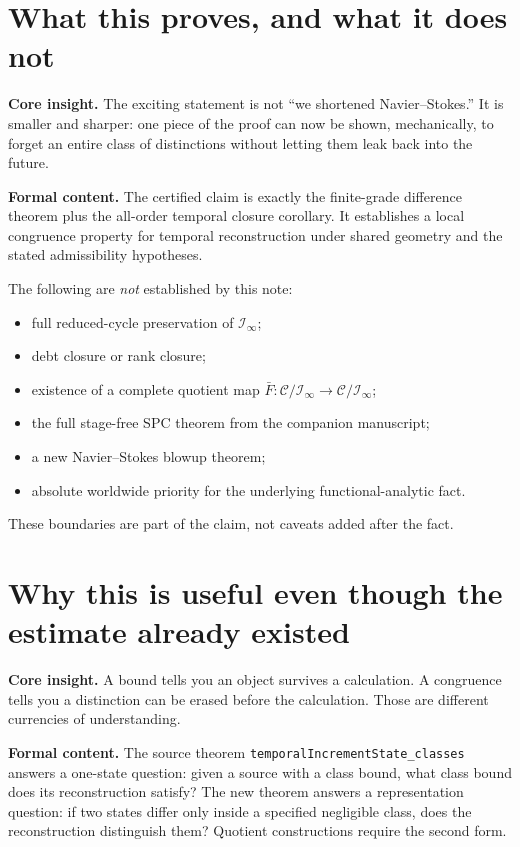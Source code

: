 \documentclass[11pt]{article}
\theoremstyle{highend}
\theoremstyle{definition}
\newcommand{\Iinf}{\mathcal I_{\infty}}
\begin{document}
\section{What this proves, and what it does not}
\begin{eurekabox}
\textbf{Core insight.} The exciting statement is not ``we shortened Navier--Stokes.'' It is smaller and sharper: one piece of the proof can now be shown, mechanically, to forget an entire class of distinctions without letting them leak back into the future.
\end{eurekabox}
\noindent\textbf{Formal content.}
The certified claim is exactly the finite-grade difference theorem plus the all-order temporal closure corollary. It establishes a local congruence property for temporal reconstruction under shared geometry and the stated admissibility hypotheses.

The following are \emph{not} established by this note:
\begin{itemize}
\item full reduced-cycle preservation of \(\Iinf\);
\item debt closure or rank closure;
\item existence of a complete quotient map \(\bar F:\mathcal C/\Iinf\to\mathcal C/\Iinf\);
\item the full stage-free SPC theorem from the companion manuscript;
\item a new Navier--Stokes blowup theorem;
\item absolute worldwide priority for the underlying functional-analytic fact.
\end{itemize}
These boundaries are part of the claim, not caveats added after the fact.

\section{Why this is useful even though the estimate already existed}
\begin{eurekabox}
\textbf{Core insight.} A bound tells you an object survives a calculation. A congruence tells you a distinction can be erased before the calculation. Those are different currencies of understanding.
\end{eurekabox}
\noindent\textbf{Formal content.}
The source theorem \texttt{temporalIncrementState\_classes} answers a one-state question: given a source with a class bound, what class bound does its reconstruction satisfy? The new theorem answers a representation question: if two states differ only inside a specified negligible class, does the reconstruction distinguish them? Quotient constructions require the second form.
\end{document}
